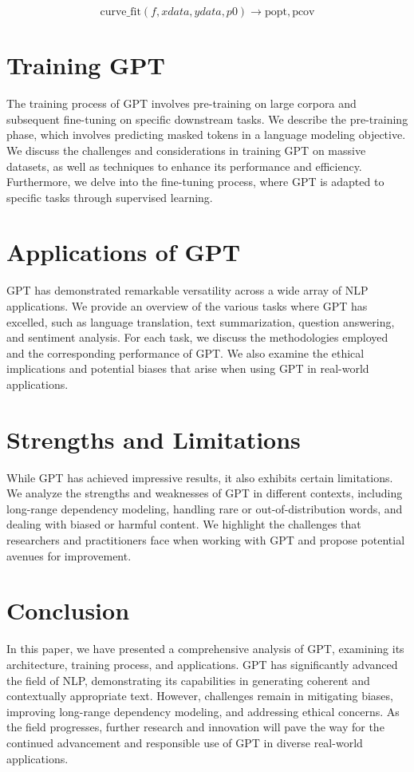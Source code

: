 \documentclass[a4paper,10pt,twocolumn]{article}
\begin{document}
    \begin{equation}
    \text{{curve\_fit}}(f, xdata, ydata, p0) \to \text{{popt}}, \text{{pcov}}
    \end{equation}


\section{Training GPT}
The training process of GPT involves pre-training on large corpora and subsequent fine-tuning on specific downstream tasks. We describe the pre-training phase, which involves predicting masked tokens in a language modeling objective. We discuss the challenges and considerations in training GPT on massive datasets, as well as techniques to enhance its performance and efficiency. Furthermore, we delve into the fine-tuning process, where GPT is adapted to specific tasks through supervised learning.

\section{Applications of GPT}
GPT has demonstrated remarkable versatility across a wide array of NLP applications. We provide an overview of the various tasks where GPT has excelled, such as language translation, text summarization, question answering, and sentiment analysis. For each task, we discuss the methodologies employed and the corresponding performance of GPT. We also examine the ethical implications and potential biases that arise when using GPT in real-world applications.

\section{Strengths and Limitations}
While GPT has achieved impressive results, it also exhibits certain limitations. We analyze the strengths and weaknesses of GPT in different contexts, including long-range dependency modeling, handling rare or out-of-distribution words, and dealing with biased or harmful content. We highlight the challenges that researchers and practitioners face when working with GPT and propose potential avenues for improvement.

\section{Conclusion}
In this paper, we have presented a comprehensive analysis of GPT, examining its architecture, training process, and applications. GPT has significantly advanced the field of NLP, demonstrating its capabilities in generating coherent and contextually appropriate text. However, challenges remain in mitigating biases, improving long-range dependency modeling, and addressing ethical concerns. As the field progresses, further research and innovation will pave the way for the continued advancement and responsible use of GPT in diverse real-world applications.
\end{document}
